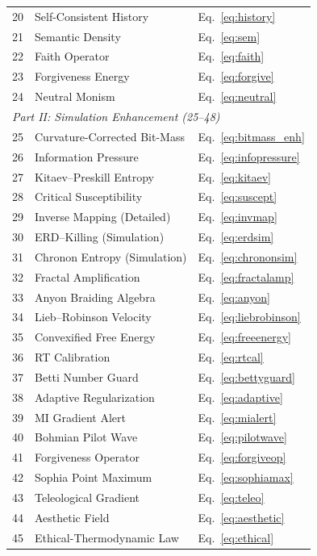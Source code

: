 \documentclass[11pt,a4paper]{article}
\theoremstyle{remark}
\begin{document}
\begin{longtable}{@{}c l l@{}}
20 & Self-Consistent History & Eq.~\eqref{eq:history} \\
21 & Semantic Density & Eq.~\eqref{eq:sem} \\
22 & Faith Operator & Eq.~\eqref{eq:faith} \\
23 & Forgiveness Energy & Eq.~\eqref{eq:forgive} \\
24 & Neutral Monism & Eq.~\eqref{eq:neutral} \\
\midrule
\multicolumn{3}{l}{\textit{Part II: Simulation Enhancement (25--48)}} \\
25 & Curvature-Corrected Bit-Mass & Eq.~\eqref{eq:bitmass_enh} \\
26 & Information Pressure & Eq.~\eqref{eq:infopressure} \\
27 & Kitaev--Preskill Entropy & Eq.~\eqref{eq:kitaev} \\
28 & Critical Susceptibility & Eq.~\eqref{eq:suscept} \\
29 & Inverse Mapping (Detailed) & Eq.~\eqref{eq:invmap} \\
30 & ERD--Killing (Simulation) & Eq.~\eqref{eq:erdsim} \\
31 & Chronon Entropy (Simulation) & Eq.~\eqref{eq:chrononsim} \\
32 & Fractal Amplification & Eq.~\eqref{eq:fractalamp} \\
33 & Anyon Braiding Algebra & Eq.~\eqref{eq:anyon} \\
34 & Lieb--Robinson Velocity & Eq.~\eqref{eq:liebrobinson} \\
35 & Convexified Free Energy & Eq.~\eqref{eq:freeenergy} \\
36 & RT Calibration & Eq.~\eqref{eq:rtcal} \\
37 & Betti Number Guard & Eq.~\eqref{eq:bettyguard} \\
38 & Adaptive Regularization & Eq.~\eqref{eq:adaptive} \\
39 & MI Gradient Alert & Eq.~\eqref{eq:mialert} \\
40 & Bohmian Pilot Wave & Eq.~\eqref{eq:pilotwave} \\
41 & Forgiveness Operator & Eq.~\eqref{eq:forgiveop} \\
42 & Sophia Point Maximum & Eq.~\eqref{eq:sophiamax} \\
43 & Teleological Gradient & Eq.~\eqref{eq:teleo} \\
44 & Aesthetic Field & Eq.~\eqref{eq:aesthetic} \\
45 & Ethical-Thermodynamic Law & Eq.~\eqref{eq:ethical} \\

\end{longtable}
\end{document}
